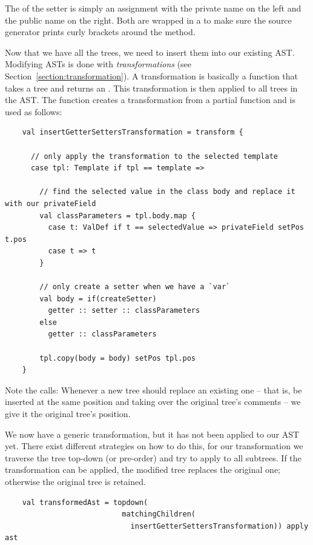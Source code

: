 \documentclass[10pt,a4paper,oneside]{scrreprt}
\begin{document}
The  of the setter is simply an assignment with the private name on the left and the public name on the right. Both  are wrapped in a  to make sure the source generator prints curly brackets around the method.

Now that we have all the trees, we need to insert them into our existing AST. Modifying ASTs is done with \textit{transformations} (see Section~\vref{section:transformation}). A transformation is basically a function that takes a tree and returns an . This transformation is then applied to all trees in the AST. 
\newpage
The  function creates a transformation from a partial function and is used as follows:

\begin{lstlisting}
    val insertGetterSettersTransformation = transform {
        
      // only apply the transformation to the selected template
      case tpl: Template if tpl == template => 
      
        // find the selected value in the class body and replace it with our privateField
        val classParameters = tpl.body.map { 
          case t: ValDef if t == selectedValue => privateField setPos t.pos
          case t => t 
        }
      
        // only create a setter when we have a `var`
        val body = if(createSetter)  
          getter :: setter :: classParameters
        else
          getter :: classParameters
        
        tpl.copy(body = body) setPos tpl.pos
    }
\end{lstlisting}

Note the  calls: Whenever a new tree should replace an existing one -- that is, be inserted at the same position and taking over the original tree's comments -- we give it the original tree's position.

We now have a generic transformation, but it has not been applied to our AST yet. There exist different strategies on how to do this, for our transformation we traverse the tree top-down (or pre-order) and try to apply  to all subtrees. If the transformation can be applied, the modified tree replaces the original one; otherwise the original tree is retained.

\begin{lstlisting}
    val transformedAst = topdown(
                           matchingChildren(
                             insertGetterSettersTransformation)) apply ast
\end{lstlisting}
    
\end{document}
